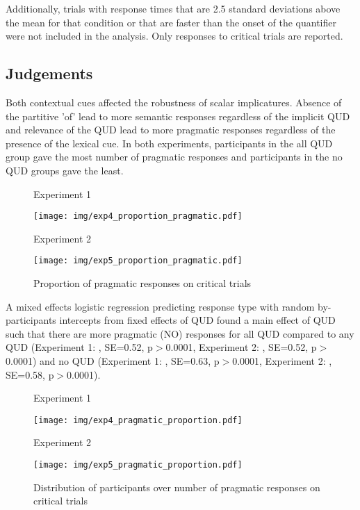 \documentclass[12pt]{article}
\begin{document}
Additionally, trials with response times that are 2.5 standard deviations above the mean for that condition or that are faster than the onset of the quantifier were not included in the analysis. Only responses to critical trials are reported. 


\subsection*{Judgements}

Both contextual cues affected the robustness of scalar implicatures. Absence of the partitive 'of' lead to more semantic responses regardless of the implicit QUD and relevance of the QUD lead to more pragmatic responses regardless of the presence of the lexical cue. In both experiments, participants in the all QUD group gave the most number of pragmatic responses and participants in the no QUD groups gave the least.

\begin{figure}[!ht]  
\begin{minipage}{.5\textwidth}
    \caption*{Experiment 1}
    \texttt{[image: img/exp4\_proportion\_pragmatic.pdf]}    
    \end{minipage}%
\begin{minipage}{.5\textwidth}
    \caption*{Experiment 2}
    \texttt{[image: img/exp5\_proportion\_pragmatic.pdf]}
    \end{minipage}%
    \caption{Proportion of pragmatic responses on critical trials}
\end{figure}

\noindent A mixed effects logistic regression predicting response type with random by-participants intercepts from fixed effects of QUD found a main effect of QUD such that there are more pragmatic (NO) responses for all QUD compared to any QUD (Experiment 1: , SE=0.52, p$>$0.0001, Experiment 2: , SE=0.52, p$>$0.0001) and no QUD (Experiment 1: , SE=0.63, p$>$0.0001, Experiment 2: , SE=0.58, p$>$0.0001).

\begin{figure}[!ht] 
    \begin{minipage}{.5\textwidth}
    \caption*{Experiment 1}
    \texttt{[image: img/exp4\_pragmatic\_proportion.pdf]}
    \end{minipage}%
    \begin{minipage}{.5\textwidth}
    \caption*{Experiment 2}
    \texttt{[image: img/exp5\_pragmatic\_proportion.pdf]}
    \end{minipage}%
    \caption{Distribution of participants over number of pragmatic responses on critical trials}
\end{figure}
\end{document}
